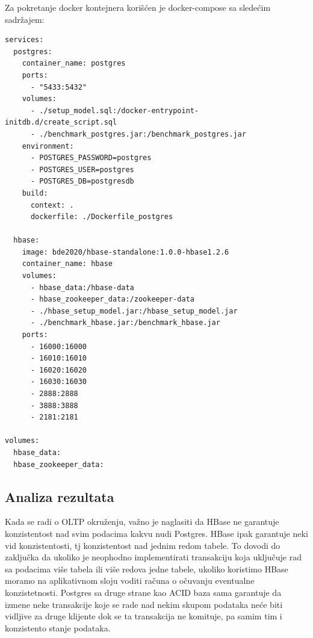 \documentclass[12pt,oneside]{memoir}
\begin{document}
 Za pokretanje docker kontejnera korišćen je docker-compose sa sledećim sadržajem:


\begin{lstlisting}[title={docker-compose.yml},captionpos=t]
services: 
  postgres:
    container_name: postgres
    ports:
      - "5433:5432"
    volumes:
      - ./setup_model.sql:/docker-entrypoint-initdb.d/create_script.sql
      - ./benchmark_postgres.jar:/benchmark_postgres.jar
    environment:
      - POSTGRES_PASSWORD=postgres
      - POSTGRES_USER=postgres
      - POSTGRES_DB=postgresdb
    build:
      context: .
      dockerfile: ./Dockerfile_postgres

  hbase:
    image: bde2020/hbase-standalone:1.0.0-hbase1.2.6
    container_name: hbase
    volumes:
      - hbase_data:/hbase-data
      - hbase_zookeeper_data:/zookeeper-data
      - ./hbase_setup_model.jar:/hbase_setup_model.jar
      - ./benchmark_hbase.jar:/benchmark_hbase.jar
    ports:
      - 16000:16000
      - 16010:16010
      - 16020:16020
      - 16030:16030
      - 2888:2888
      - 3888:3888
      - 2181:2181

volumes:
  hbase_data:
  hbase_zookeeper_data:
\end{lstlisting}


\subsection{Analiza rezultata}

Kada se radi o OLTP okruženju, važno je naglasiti da HBase ne garantuje konzistentost nad svim podacima kakvu nudi Postgres. HBase ipak garantuje neki vid konzistentosti, tj konzistentost nad jednim redom tabele. To dovodi do zaključka da ukoliko je neophodno implementirati transakciju koja uključuje rad sa podacima više tabela ili više redova jedne tabele, ukoliko koristimo HBase moramo na aplikativnom sloju voditi računa o očuvanju  eventualne konzistetnosti. Postgres sa druge strane kao ACID baza sama garantuje da izmene neke transakcije koje se rade nad nekim skupom podataka neće biti vidljive za druge klijente dok se ta transakcija ne komituje, pa samim tim i konzistento stanje podataka.
\end{document}
